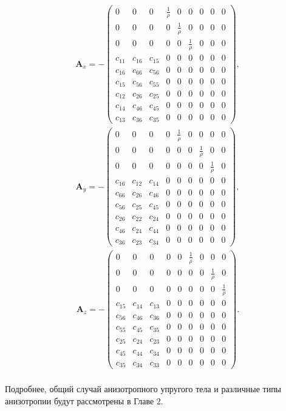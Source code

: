 \begin{align}
\label{anisotropic_mat1}	
\mathbf{A}_x = - 
\left( \begin{array}{cccccccccccc}
0 & 0 & 0 & \frac 1 \rho & 0 & 0 & 0 & 0 & 0 \\ 
0 & 0 & 0 & 0 & \frac 1 \rho & 0 & 0 & 0 & 0 \\ 
0 & 0 & 0 & 0 & 0 & \frac 1 \rho & 0 & 0 & 0 \\ 
c_{11} & c_{16} & c_{15} & 0 & 0 & 0 & 0 & 0 & 0 \\ 
c_{16} & c_{66} & c_{56} & 0 & 0 & 0 & 0 & 0 & 0 \\
c_{15} & c_{56} & c_{55} & 0 & 0 & 0 & 0 & 0 & 0 \\ 
c_{12} & c_{26} & c_{25} & 0 & 0 & 0 & 0 & 0 & 0 \\ 
c_{14} & c_{46} & c_{45} & 0 & 0 & 0 & 0 & 0 & 0 \\ 
c_{13} & c_{36} & c_{35} & 0 & 0 & 0 & 0 & 0 & 0
\end{array} \right),
\end{align} 
\begin{align}
\label{anisotropic_mat2}
\mathbf{A}_y = - 
\left( \begin{array}{cccccccccccc}
0 & 0 & 0 & 0 & \frac 1 \rho & 0 & 0 & 0 & 0 \\ 
0 & 0 & 0 & 0 & 0 & 0 & \frac 1 \rho & 0 & 0 \\ 
0 & 0 & 0 & 0 & 0 & 0 & 0 & \frac 1 \rho & 0 \\ 
c_{16} & c_{12} & c_{14} & 0 & 0 & 0 & 0 & 0 & 0 \\ 
c_{66} & c_{26} & c_{46} & 0 & 0 & 0 & 0 & 0 & 0 \\
c_{56} & c_{25} & c_{45} & 0 & 0 & 0 & 0 & 0 & 0 \\
c_{26} & c_{22} & c_{24} & 0 & 0 & 0 & 0 & 0 & 0 \\ 
c_{46} & c_{24} & c_{44} & 0 & 0 & 0 & 0 & 0 & 0 \\
c_{36} & c_{23} & c_{34} & 0 & 0 & 0 & 0 & 0 & 0   
\end{array} \right),
\end{align}
\begin{align}
\label{anisotropic_mat3}
\mathbf{A}_z = - 
\left( \begin{array}{cccccccccccc}
0 & 0 & 0 & 0 & 0 & \frac 1 \rho & 0 & 0 & 0 \\ 
0 & 0 & 0 & 0 & 0 & 0 & 0 & \frac 1 \rho & 0 \\ 
0 & 0 & 0 & 0 & 0 & 0 & 0 & 0 & \frac 1 \rho \\ 
c_{15} & c_{14} & c_{13} & 0 & 0 & 0 & 0 & 0 & 0 \\ 
c_{56} & c_{46} & c_{36} & 0 & 0 & 0 & 0 & 0 & 0 \\
c_{55} & c_{45} & c_{35} & 0 & 0 & 0 & 0 & 0 & 0 \\ 
c_{25} & c_{24} & c_{23} & 0 & 0 & 0 & 0 & 0 & 0 \\ 
c_{45} & c_{44} & c_{34} & 0 & 0 & 0 & 0 & 0 & 0 \\ 
c_{35} & c_{34} & c_{33} & 0 & 0 & 0 & 0 & 0 & 0  
\end{array} \right).
\end{align}\\

	Подробнее, общий случай анизотропного упругого тела и различные типы анизотропии будут рассмотрены в Главе 2.
